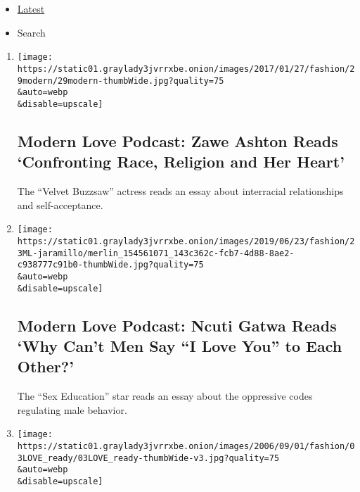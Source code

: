 \begin{itemize}
\tightlist
\item
  \protect\hyperlink{stream-panel}{Latest}
\item
  Search
\end{itemize}

\begin{enumerate}
\def\labelenumi{\arabic{enumi}.}
\item
  \href{/2020/06/24/style/modern-love-podcast-zawe-ashton.html}{}

  \texttt{[image: https://static01.graylady3jvrrxbe.onion/images/2017/01/27/fashion/29modern/29modern-thumbWide.jpg?quality=75\\\&auto=webp\\\&disable=upscale]}

  \hypertarget{modern-love-podcast-zawe-ashton-reads-confronting-race-religion-and-her-heart}{%
  \subsection{Modern Love Podcast: Zawe Ashton Reads `Confronting Race,
  Religion and Her
  Heart'}\label{modern-love-podcast-zawe-ashton-reads-confronting-race-religion-and-her-heart}}

  The ``Velvet Buzzsaw'' actress reads an essay about interracial
  relationships and self-acceptance.
\item
  \href{/2020/06/17/style/modern-love-podcast-ncuti-gatwa.html}{}

  \texttt{[image: https://static01.graylady3jvrrxbe.onion/images/2019/06/23/fashion/23ML-jaramillo/merlin\_154561071\_143c362c-fcb7-4d88-8ae2-c938777c91b0-thumbWide.jpg?quality=75\\\&auto=webp\\\&disable=upscale]}

  \hypertarget{modern-love-podcast-ncuti-gatwa-reads-why-cant-men-say-i-love-you-to-each-other}{%
  \subsection{Modern Love Podcast: Ncuti Gatwa Reads `Why Can't Men Say
  ``I Love You'' to Each
  Other?'}\label{modern-love-podcast-ncuti-gatwa-reads-why-cant-men-say-i-love-you-to-each-other}}

  The ``Sex Education'' star reads an essay about the oppressive codes
  regulating male behavior.
\item
  \href{/2020/06/10/style/modern-love-podcast-lorraine-toussant-updated-poscript.html}{}

  \texttt{[image: https://static01.graylady3jvrrxbe.onion/images/2006/09/01/fashion/03LOVE\_ready/03LOVE\_ready-thumbWide-v3.jpg?quality=75\\\&auto=webp\\\&disable=upscale]}


\end{enumerate}
